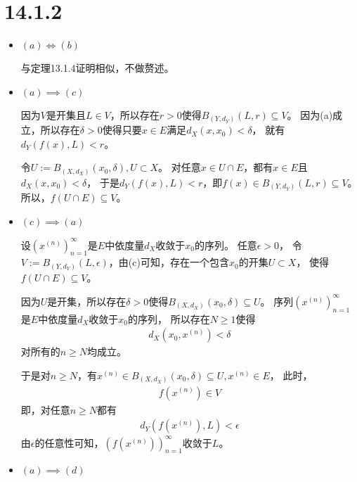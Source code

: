 \documentclass{article}
\begin{document}
\section*{14.1.2}

\begin{itemize}
  \item $(a) \Leftrightarrow (b)$

        与定理13.1.4证明相似，不做赘述。


  \item $(a) \implies (c)$

        因为$V$是开集且$L \in V$，所以存在$r > 0$使得$B_{(Y, d_Y)}(L, r) \subseteq V$。
        因为(a)成立，所以存在$\delta > 0$使得只要$x \in E$满足$d_X(x, x_0) < \delta$，
        就有$d_Y(f(x), L) < r$。

        令$U := B_{(X, d_X)}(x_0, \delta), U \subset X$。
        对任意$x \in U \cap E$，都有$x \in E$且$d_X(x, x_0) < \delta$，
        于是$d_Y(f(x), L) < r$，即$f(x) \in B_{(Y, d_Y)}(L, r) \subseteq V$。
        所以，$f(U \cap E) \subseteq V$。

  \item $(c) \implies (a)$

        设$(x^{(n)})_{n = 1}^\infty$是$E$中依度量$d_X$收敛于$x_0$的序列。
        任意$\epsilon > 0$，
        令$V := B_{(Y, d_Y)}(L, \epsilon)$，由(c)可知，存在一个包含$x_0$的开集$U \subset X$，
        使得$f(U \cap E) \subseteq V$。

        因为$U$是开集，所以存在$\delta > 0$使得$B_{(X, d_X)}(x_0, \delta) \subseteq U$。
        序列$(x^{(n)})_{n = 1}^\infty$是$E$中依度量$d_X$收敛于$x_0$的序列，
        所以存在$N \geq 1$使得
        \begin{align*}
          d_X(x_0, x^{(n)}) < \delta
        \end{align*}
        对所有的$n \geq N$均成立。

        于是对$n \geq N$，有$x^{(n)} \in B_{(X, d_X)}(x_0, \delta) \subseteq U, x^{(n)} \in E$，
        此时，
        \begin{align*}
          f(x^{(n)}) \in V
        \end{align*}
        即，对任意$n \geq N$都有
        \begin{align*}
          d_Y(f(x^{(n)}), L) < \epsilon
        \end{align*}
        由$\epsilon$的任意性可知，$(f(x^{(n)}))_{n = 1}^\infty$收敛于$L$。

  \item $(a) \implies (d)$


\end{itemize}
\end{document}
